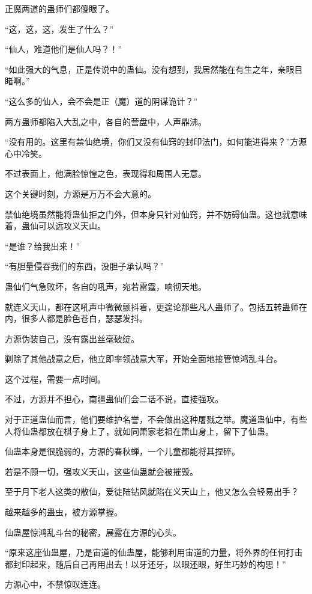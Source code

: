 \begin{this_body}
正魔两道的蛊师们都傻眼了。

“这，这，这，发生了什么？”

“仙人，难道他们是仙人吗？！”

“如此强大的气息，正是传说中的蛊仙。没有想到，我居然能在有生之年，亲眼目睹啊。”

“这么多的仙人，会不会是正（魔）道的阴谋诡计？”

两方蛊师都陷入大乱之中，各自的营盘中，人声鼎沸。

“没有用的。这里有禁仙绝境，你们又没有仙窍的封印法门，如何能进得来？”方源心中冷笑。

不过表面上，他满脸惊惶之色，表现得和周围人无意。

这个关键时刻，方源是万万不会大意的。

禁仙绝境虽然能将蛊仙拒之门外，但本身只针对仙窍，并不妨碍仙蛊。这也就意味着，蛊仙可以远攻义天山。

“是谁？给我出来！”

“有胆量侵吞我们的东西，没胆子承认吗？”

蛊仙们气急败坏，各自的吼声，宛若雷霆，响彻天地。

就连义天山，都在这吼声中微微颤抖着，更遑论那些凡人蛊师了。包括五转蛊师在内，很多人都是脸色苍白，瑟瑟发抖。

方源伪装自己，没有露出丝毫破绽。

剿除了其他战意之后，他立即率领战意大军，开始全面地接管惊鸿乱斗台。

这个过程，需要一点时间。

不过，方源并不担心，南疆蛊仙们会二话不说，直接强攻。

对于正道蛊仙而言，他们要维护名誉，不会做出这种屠戮之举。魔道蛊仙中，有些人将仙蛊都放在棋子身上了，就如同萧家老祖在萧山身上，留下了仙蛊。

仙蛊本身是很脆弱的，方源的春秋蝉，一个儿童都能将其捏碎。

若是不顾一切，强攻义天山，这些仙蛊就会被摧毁。

至于月下老人这类的散仙，爱徒陆钻风就陷在义天山上，他又怎么会轻易出手？

越来越多的蛊虫，被方源掌握。

仙蛊屋惊鸿乱斗台的秘密，展露在方源的心头。

“原来这座仙蛊屋，乃是宙道的仙蛊屋，能够利用宙道的力量，将外界的任何打击都封印起来，随后自己再用出去！以牙还牙，以眼还眼，好生巧妙的构思！”

方源心中，不禁惊叹连连。

\end{this_body}

